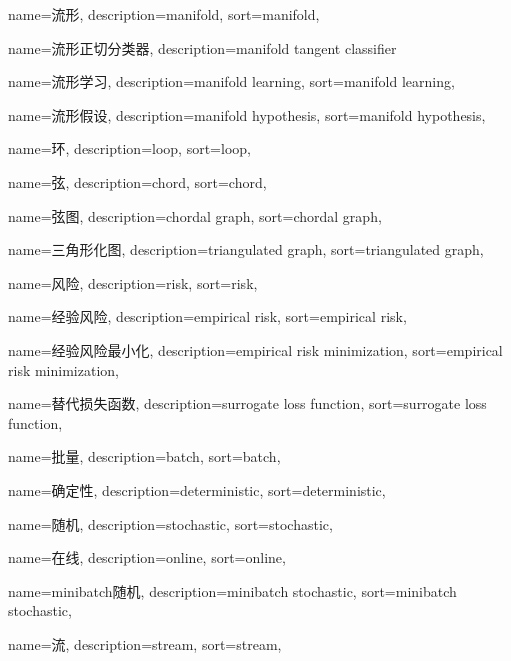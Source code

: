 {
  name=流形,
  description={manifold},
  sort={manifold},
}

{
  name=流形正切分类器,
  description={manifold tangent classifier}
}

{
  name=流形学习,
  description={manifold learning},
  sort={manifold learning},
}

{
  name=流形假设,
  description={manifold hypothesis},
  sort={manifold hypothesis},
}

{
  name=环,
  description={loop},
  sort={loop},
}

{
  name=弦,
  description={chord},
  sort={chord},
}

{
  name=弦图,
  description={chordal graph},
  sort={chordal graph},
}

{
  name=三角形化图,
  description={triangulated graph},
  sort={triangulated graph},
}

{
  name=风险,
  description={risk},
  sort={risk},
}

{
  name=经验风险,
  description={empirical risk},
  sort={empirical risk},
}

{
  name=经验风险最小化,
  description={empirical risk minimization},
  sort={empirical risk minimization},
}

{
  name=替代损失函数,
  description={surrogate loss function},
  sort={surrogate loss function},
}

{
  name=批量,
  description={batch},
  sort={batch},
}

{
  name=确定性,
  description={deterministic},
  sort={deterministic},
}

{
  name=随机,
  description={stochastic},
  sort={stochastic},
}

{
  name=在线,
  description={online},
  sort={online},
}

{
  name=minibatch随机, %
  description={minibatch stochastic},
  sort={minibatch stochastic},
}

{
  name=流,
  description={stream},
  sort={stream},
}


